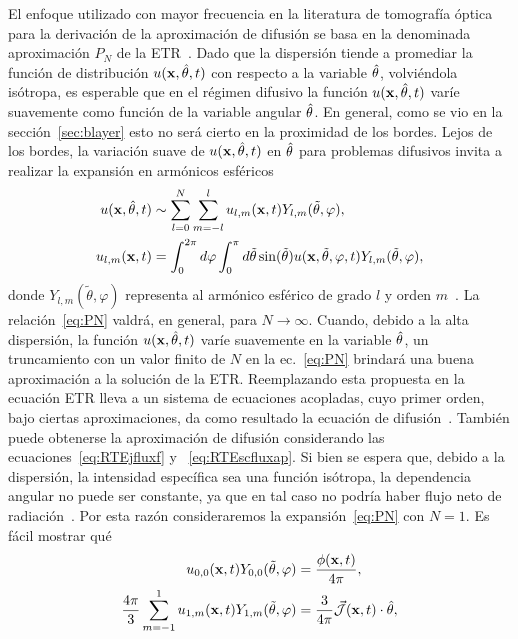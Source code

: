 El enfoque utilizado con mayor frecuencia en la literatura de tomografía óptica para la derivación de la aproximación de difusión se basa 
en la denominada aproximación $P_N$ de la ETR~\cite{Arridge2009,Wang2009}. Dado que la dispersión tiende a promediar la función de distribución $u(\mathbf{x},\hat{\theta},t)$ con respecto a la variable $\hat{\theta}$, volviéndola isótropa, es esperable que en el régimen difusivo la función $u(\mathbf{x},\hat{\theta},t)$ varíe suavemente como función de la variable angular $\hat{\theta}$. En general, como se vio en la sección~\ref{sec:blayer} esto no será cierto en la proximidad de los bordes. Lejos de los bordes, la variación suave de $u(\mathbf{x},\hat{\theta},t)$ en $\hat{\theta}$ para problemas difusivos invita a realizar la expansión en armónicos esféricos
\begin{equation}
\begin{split}
\begin{aligned}
u(\mathbf{x},\hat{\theta},t)&\sim \sum_{l=0}^{N}\sum_{m=-l}^lu_{l,m}(\mathbf{x},t)Y_{l,m}(\tilde{\theta},\varphi), \\ 
u_{l,m}(\mathbf{x},t)&=\int_{0}^{2\pi} d\varphi \int_0^{\pi} d\tilde{\theta} \sin (\tilde{\theta})  u(\mathbf{x},\tilde{\theta},\varphi,t) Y_{l,m}(\tilde{\theta},\varphi) ,
\end{aligned}
\end{split}
\label{eq:PN}
\end{equation}
donde $Y_{l,m}(\tilde{\theta},\varphi)$ representa al armónico esférico de grado $l$ y orden $m$~\cite{Sansone1991}. La relación~\eqref{eq:PN} valdrá, en general, para $N \rightarrow \infty$. Cuando, debido a la alta dispersión, la función $u(\mathbf{x},\hat{\theta},t)$ 
varíe suavemente en la variable $\hat{\theta}$, un truncamiento con un valor 
finito de $N$ en la ec.~\eqref{eq:PN} brindará una buena aproximación 
a la solución de la ETR.
Reemplazando esta propuesta en la ecuación ETR lleva a un sistema de ecuaciones acopladas, cuyo primer orden, bajo ciertas aproximaciones, da como resultado la ecuación de difusión~\cite[Sec. 3]{Arridge1999}. También puede obtenerse la aproximación de difusión considerando las ecuaciones~\eqref{eq:RTEjfluxf} y ~\eqref{eq:RTEscfluxap}. Si bien se espera que, debido a la dispersión, la intensidad específica sea una función isótropa, la dependencia angular no puede ser constante, ya que en tal caso 
no podría haber flujo neto de radiación~\cite[cap. 9, p. 176]{Ishimaru1978}. Por esta razón consideraremos la expansión~\eqref{eq:PN} con $N=1$. 
Es fácil mostrar qué
\begin{equation}
\begin{split}
\begin{aligned}
u_{0,0}(\mathbf{x},t) Y_{0,0}(\tilde{\theta},\varphi) &=\frac{\phi(\mathbf{x},t)}{4\pi},\\
\frac{4\pi}{3} \sum_{m=-1}^1 u_{1,m}(\mathbf{x},t)Y_{1,m} (\tilde{\theta},\varphi) & = \frac{3}{4\pi} \vec{ \mathcal{J}}(\mathbf{x},t) \cdot \hat{\theta},
\end{aligned}
\end{split}
\label{eq:PN2}
\end{equation}
